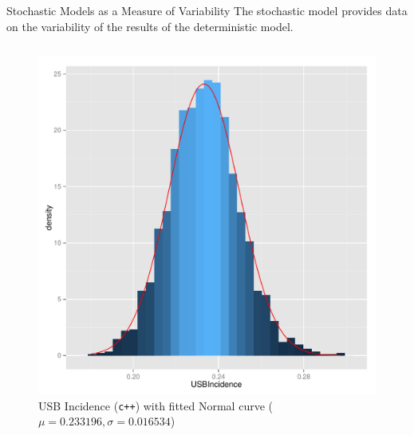 \documentclass[final]{beamer}
\begin{document}
\begin{frame}
\begin{columns}
\begin{column}{.3\textwidth}
      \begin{block}{Stochastic Models as a Measure of Variability}
        The stochastic model provides data on the variability of the results
        of the deterministic model.
        \begin{block}{}
          \vspace{-2em}
          \begin{column}{.45\textwidth}
            \begin{figure}[h]
              \begin{center}
                \includegraphics[width=\textwidth]{IN0dist}
              \end{center}
              \caption{USB Incidence (\texttt{c++}) with fitted Normal curve ($\mu = 0.233196, \sigma = 0.016534$)}
              \label{fig:IN0dist}
            \end{figure}
          \end{column}
          \begin{column}{.45\textwidth}
            \begin{figure}[h]
              \begin{center}

\end{center}
\end{figure}
\end{column}
\end{block}
\end{block}
\end{column}
\end{columns}
\end{frame}
\end{document}
